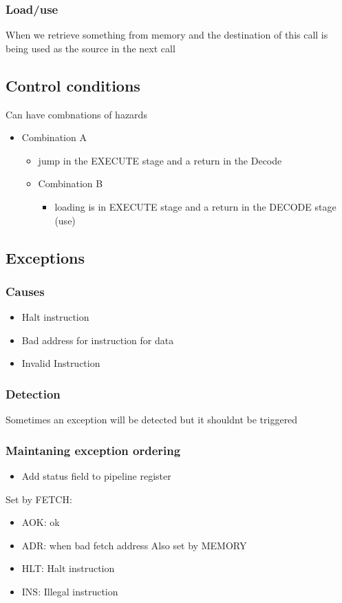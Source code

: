 \documentclass[11pt]{article}
\begin{document}
\subsubsection{Load/use}
\label{sec:orgheadline18}
When we retrieve something from memory and the destination of this call is being used as the source in the next call
\subsection{Control conditions}
\label{sec:orgheadline20}
Can have combnations of hazards
\begin{itemize}
\item Combination A
\begin{itemize}
\item jump in the EXECUTE stage and a return in the Decode
\end{itemize}
\begin{itemize}
\item Combination B
\begin{itemize}
\item loading is in EXECUTE stage and a return in the DECODE stage (use)
\end{itemize}
\end{itemize}
\end{itemize}
\subsection{Exceptions}
\label{sec:orgheadline25}
\subsubsection{Causes}
\label{sec:orgheadline21}
\begin{itemize}
\item Halt instruction
\item Bad address for instruction for data
\item Invalid Instruction
\end{itemize}
\subsubsection{Detection}
\label{sec:orgheadline22}
Sometimes an exception will be detected but it shouldnt be triggered
\subsubsection{Maintaning exception ordering}
\label{sec:orgheadline23}
\begin{itemize}
\item Add status field to pipeline register
\end{itemize}
Set by FETCH:
\begin{itemize}
\item AOK: ok
\item ADR: when bad fetch address
Also set by MEMORY
\item HLT: Halt instruction
\item INS: Illegal instruction
\end{itemize}
\end{document}
